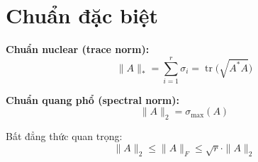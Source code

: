 \section{Chuẩn đặc biệt}

\textbf{Chuẩn nuclear (trace norm):}
\[
\|A\|_* = \sum_{i=1}^r \sigma_i = \operatorname{tr}\bigl(\sqrt{A^*A}\bigr)
\]

\textbf{Chuẩn quang phổ (spectral norm):}
\[
\|A\|_2 = \sigma_{\max}(A)
\]

Bất đẳng thức quan trọng:
\[
\|A\|_2 \le \|A\|_F \le \sqrt{r} \cdot \|A\|_2
\]

